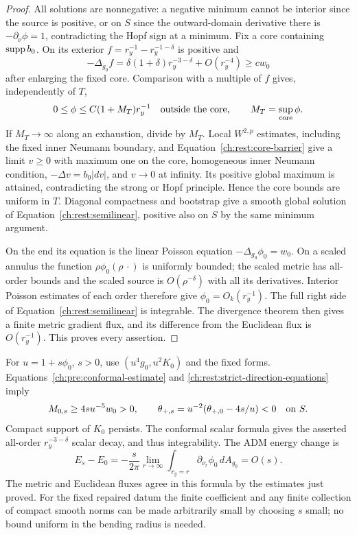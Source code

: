 \begin{proof}
All solutions are nonnegative: a negative minimum cannot be interior
since the source is positive, or on $S$ since the outward-domain
derivative there is $-\partial_\nu\phi=1$, contradicting the Hopf
sign at a minimum. Fix a core containing $\operatorname{supp} b_0$. On its exterior
$f=r_y^{-1}-r_y^{-1-\delta}$ is positive and
\[
 -\Delta_{g_0}f
 =\delta(1+\delta)r_y^{-3-\delta}+O(r_y^{-4})
 \ge c w_0
\]
after enlarging the fixed core. Comparison with a multiple of $f$
gives, independently of $T$,
\begin{equation}
 \label{ch:rest:core-barrier}
 0\le\phi\le C(1+M_T)r_y^{-1}\quad\hbox{outside the core},
 \qquad M_T=\sup_{\mathrm{core}}\phi.
\end{equation}
If $M_T\to\infty$ along an exhaustion, divide by $M_T$. Local
$W^{2,p}$ estimates, including the fixed inner Neumann boundary,
and Equation~\eqref{ch:rest:core-barrier} give a limit $v\ge0$ with
maximum one on the core, homogeneous inner Neumann condition,
$-\Delta v=b_0|dv|$, and $v\to0$ at infinity. Its positive global
maximum is attained, contradicting the strong or Hopf principle.
Hence the core bounds are uniform in $T$. Diagonal compactness and
bootstrap give a smooth global solution of
Equation~\eqref{ch:rest:semilinear}, positive also on $S$ by the same
minimum argument.

On the end its equation is the linear Poisson equation
$-\Delta_{g_0}\phi_0=w_0$. On a scaled annulus the function
$\rho\phi_0(\rho\,\cdot)$ is uniformly bounded; the scaled metric
has all-order bounds and the scaled source is $O(\rho^{-\delta})$
with all its derivatives. Interior Poisson estimates of each order
therefore give $\phi_0=O_k(r_y^{-1})$. The full right side of
Equation~\eqref{ch:rest:semilinear} is integrable. The divergence theorem
then gives a finite metric gradient flux, and its difference from the
Euclidean flux is $O(r_y^{-1})$. This proves every assertion.
\end{proof}

For $u=1+s\phi_0$, $s>0$, use $(u^4g_0,u^2K_0)$ and the fixed
forms. Equations~\eqref{ch:pre:conformal-estimate} and
\eqref{ch:rest:strict-direction-equations} imply
\begin{equation}
 \label{ch:rest:strict-margin}
 M_{0,s}\ge4s u^{-5}w_0>0,
 \qquad
 \theta_{+,s}=u^{-2}(\theta_{+,0}-4s/u)<0\quad\hbox{on }S.
\end{equation}
Compact support of $K_0$ persists. The conformal scalar formula gives
the asserted all-order $r_y^{-3-\delta}$ scalar decay, and thus
integrability. The ADM energy change is
\begin{equation}
 \label{ch:rest:strict-energy}
 E_s-E_0=-\frac{s}{2\pi}
   \lim_{r\to\infty}\int_{r_y=r}\partial_{\nu_r}\phi_0\,dA_{g_0}
   =O(s).
\end{equation}
The metric and Euclidean fluxes agree in this formula by the estimates
just proved. For the fixed repaired datum the finite coefficient and
any finite collection of compact smooth norms can be made arbitrarily
small by choosing $s$ small; no bound uniform in the bending radius is
needed.

